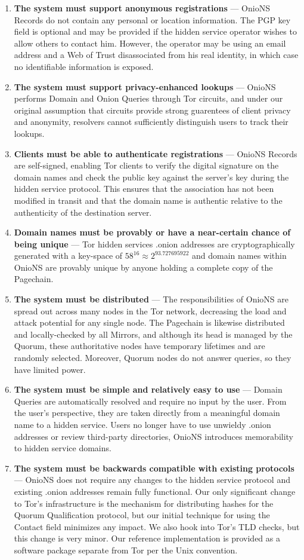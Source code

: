 \documentclass{sig-alternate}
\begin{document}
\begin{enumerate}
	\item \textbf{The system must support anonymous registrations} --- OnioNS Records do not contain any personal or location information. The PGP key field is optional and may be provided if the hidden service operator wishes to allow others to contact him. However, the operator may be using an email address and a Web of Trust disassociated from his real identity, in which case no identifiable information is exposed.
	\item \textbf{The system must support privacy-enhanced lookups} --- OnioNS performs Domain and Onion Queries through Tor circuits, and under our original assumption that circuits provide strong guarentees of client privacy and anonymity, resolvers cannot sufficiently distinguish users to track their lookups.
	\item \textbf{Clients must be able to authenticate registrations} --- OnioNS Records are self-signed, enabling Tor clients to verify the digital signature on the domain names and check the public key against the server's key during the hidden service protocol. This ensures that the association has not been modified in transit and that the domain name is authentic relative to the authenticity of the destination server.
	\item \textbf{Domain names must be provably or have a near-certain chance of being unique} --- Tor hidden services .onion addresses are cryptographically generated with a key-space of $ 58 ^ {16} \approx 2 ^ {93.727695922} $ and domain names within OnioNS are provably unique by anyone holding a complete copy of the Pagechain.
	\item \textbf{The system must be distributed} --- The responsibilities of OnioNS are spread out across many nodes in the Tor network, decreasing the load and attack potential for any single node. The Pagechain is likewise distributed and locally-checked by all Mirrors, and although its head is managed by the Quorum, these authoritative nodes have temporary lifetimes and are randomly selected. Moreover, Quorum nodes do not answer queries, so they have limited power.
	\item \textbf{The system must be simple and relatively easy to use} --- Domain Queries are automatically resolved and require no input by the user. From the user's perspective, they are taken directly from a meaningful domain name to a hidden service. Users no longer have to use unwieldy .onion addresses or review third-party directories, OnioNS introduces memorability to hidden service domains.
	\item \textbf{The system must be backwards compatible with existing protocols} --- OnioNS does not require any changes to the hidden service protocol and existing .onion addresses remain fully functional. Our only significant change to Tor's infrastructure is the mechanism for distributing hashes for the Quorum Qualification protocol, but our initial technique for using the Contact field minimizes any impact. We also hook into Tor's TLD checks, but this change is very minor. Our reference implementation is provided as a software package separate from Tor per the Unix convention.
\end{enumerate}
\end{document}
